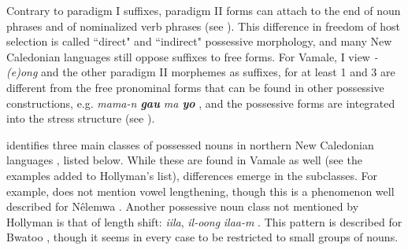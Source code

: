 Contrary to paradigm I suffixes, paradigm II forms can attach to the end of noun phrases and of nominalized verb phrases (see ). This difference in freedom of host selection is called ``direct" and ``indirect" possessive morphology, and many New Caledonian languages still oppose suffixes to free forms. For Vamale, I view \textit{-(e)ong} and the other paradigm II morphemes as suffixes, for at least 1 and 3 are different from the free pronominal forms that can be found in other possessive constructions, e.g. \textit{mama-n \textbf{gau} ma \textbf{yo}} , and the possessive forms are integrated into the stress structure (see ).


\begin{sloppypar}
\citeauthor{hollyman_etudes_1999} identifies three main classes of possessed nouns in northern New Caledonian languages \parencite[61--62]{hollyman_etudes_1999}, listed below. While these are found in Vamale as well (see the examples added to Hollyman's list), differences emerge in the subclasses. For example, \textcite{hollyman_etudes_1999} does not mention vowel lengthening, though this is a phenomenon well described for Nêlemwa \parencite[29--33]{bril_nelemwa_2002}. Another possessive noun class not mentioned by Hollyman is that of length shift: \textit{iila}, \textit{il-oong} \textit{ilaa-m} . This pattern is described for Bwatoo \parencite[37]{rivierre_bwatoo_2006}, though it seems in every case to be restricted to small groups of nouns. 
\end{sloppypar}

